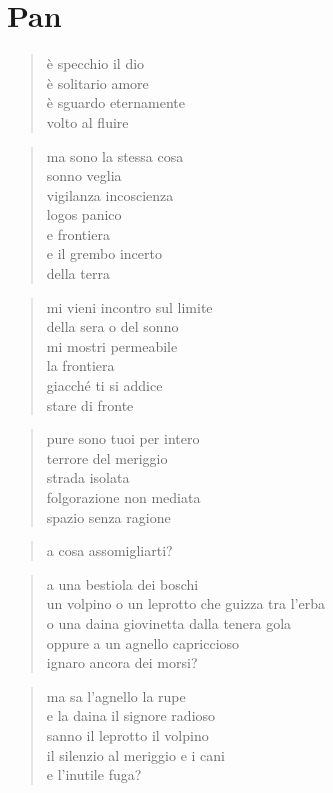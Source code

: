 \chapter*{Pan}


\begin{verse}
    è specchio il dio\\
    è solitario amore\\
    è sguardo eternamente\\
    volto al fluire
\end{verse}

\begin{verse}
    ma sono la stessa cosa\\
    sonno veglia\\
    vigilanza incoscienza\\
    logos panico\\
    e frontiera\\
    e il grembo incerto\\
    della terra
\end{verse}

\clearpage


\begin{verse}
    mi vieni incontro sul limite\\
    della sera o del sonno\\
    mi mostri permeabile\\
    la frontiera\\
    giacché ti si addice\\
    stare di fronte
\end{verse}

\begin{verse}
    pure sono tuoi per intero\\
    terrore del meriggio\\
    strada isolata\\
    folgorazione non mediata\\
    spazio senza ragione
\end{verse}

\clearpage


\begin{verse}
    a cosa assomigliarti?
\end{verse}

\begin{verse}
    a una bestiola dei boschi\\
    un volpino o un leprotto che guizza tra l'erba\\
    o una daina giovinetta dalla tenera gola\\
    oppure a un agnello capriccioso\\
    ignaro ancora dei morsi?
\end{verse}

\begin{verse}
    ma sa l'agnello la rupe\\
    e la daina il signore radioso\\
    sanno il leprotto il volpino\\
    il silenzio al meriggio e i cani\\
    e l'inutile fuga?
\end{verse}
